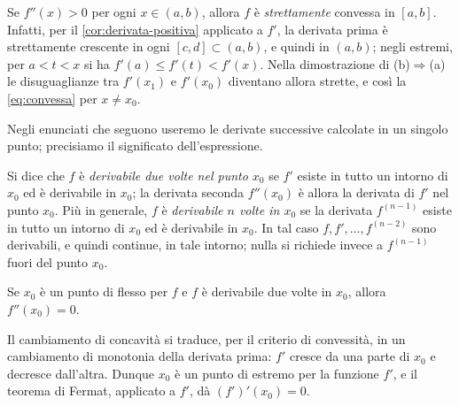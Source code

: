 \begin{osservazione}\label{oss:convessita-stretta}
Se $f''(x)>0$ per ogni $x\in(a,b)$, allora $f$ è \emph{strettamente} convessa in $[a,b]$.
Infatti, per il \cref{cor:derivata-positiva} applicato a $f'$, la derivata prima è
strettamente crescente in ogni $[c,d]\subset(a,b)$, e quindi in $(a,b)$; negli estremi,
per $a<t<x$ si ha $f'(a)\le f'(t)<f'(x)$. Nella dimostrazione di (b)$\Rightarrow$(a) le
disuguaglianze tra $f'(x_{1})$ e $f'(x_{0})$ diventano allora strette, e così la
\eqref{eq:convessa} per $x\neq x_{0}$.
\end{osservazione}

Negli enunciati che seguono useremo le derivate successive calcolate in un singolo
punto; precisiamo il significato dell'espressione.

\begin{notazione}\label{not:derivabile-n-volte}
Si dice che $f$ è \emph{derivabile due volte nel punto $x_{0}$} se $f'$ esiste in tutto un
intorno di $x_{0}$ ed è derivabile in $x_{0}$; la derivata seconda $f''(x_{0})$ è allora la
derivata di $f'$ nel punto $x_{0}$. Più in generale, $f$ è \emph{derivabile $n$ volte in
$x_{0}$} se la derivata $f^{(n-1)}$ esiste in tutto un intorno di $x_{0}$ ed è derivabile in
$x_{0}$. In tal caso $f,f',\dots,f^{(n-2)}$ sono derivabili, e quindi continue, in tale
intorno; nulla si richiede invece a $f^{(n-1)}$ fuori del punto $x_{0}$.
\end{notazione}

\begin{corollario}\label{cor:flesso-necessaria}
Se $x_{0}$ è un punto di flesso per $f$ e $f$ è derivabile due volte in $x_{0}$, allora
$f''(x_{0})=0$.
\end{corollario}

\begin{schema}
\end{schema}

\begin{strategia}
Il cambiamento di concavità si traduce, per il criterio di convessità, in un cambiamento
di monotonia della derivata prima: $f'$ cresce da una parte di $x_{0}$ e decresce
dall'altra. Dunque $x_{0}$ è un punto di estremo per la funzione $f'$, e il teorema di
Fermat, applicato a $f'$, dà $(f')'(x_{0})=0$.
\end{strategia}

